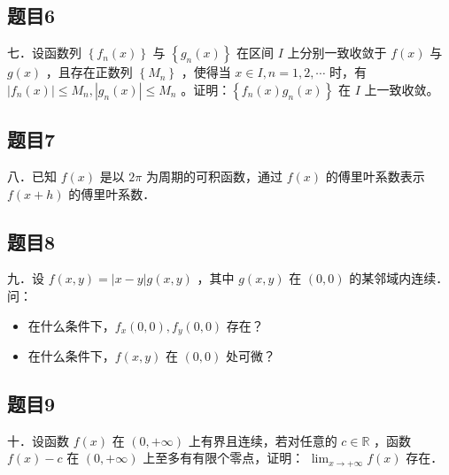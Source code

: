 \documentclass{article}
\begin{document}
\subsection{题目6}
七．设函数列 \(\left\{f_{n}(x)\right\}\) 与 \(\left\{g_{n}(x)\right\}\) 在区间 \(I\) 上分别一致收敛于 \(f(x)\) 与 \(g(x)\) ，且存在正数列 \(\left\{M_{n}\right\}\) ，使得当 \(x \in I, n=1,2, \cdots\) 时，有 \(\left|f_{n}(x)\right| \leq M_{n},\left|g_{n}(x)\right| \leq M_{n}\) 。证明：\(\left\{f_{n}(x) g_{n}(x)\right\}\) 在 \(I\) 上一致收敛。

\subsection{题目7}
八．已知 \(f(x)\) 是以 \(2 \pi\) 为周期的可积函数，通过 \(f(x)\) 的傅里叶系数表示 \(f(x+h)\) 的傅里叶系数．

\subsection{题目8}
九．设 \(f(x, y)=|x-y| g(x, y)\) ，其中 \(g(x, y)\) 在 \((0,0)\) 的某邻域内连续．问：

\begin{itemize}
  \item[（1）] 在什么条件下，\(f_{x}(0,0), f_{y}(0,0)\) 存在？
  \item[（2）] 在什么条件下，\(f(x, y)\) 在 \((0,0)\) 处可微？
\end{itemize}

\subsection{题目9}
十．设函数 \(f(x)\) 在 \((0,+\infty)\) 上有界且连续，若对任意的 \(c \in \mathbb{R}\) ，函数 \(f(x)-c\) 在 \((0,+\infty)\) 上至多有有限个零点，证明： \(\lim _{x \rightarrow+\infty} f(x)\) 存在．
\end{document}
